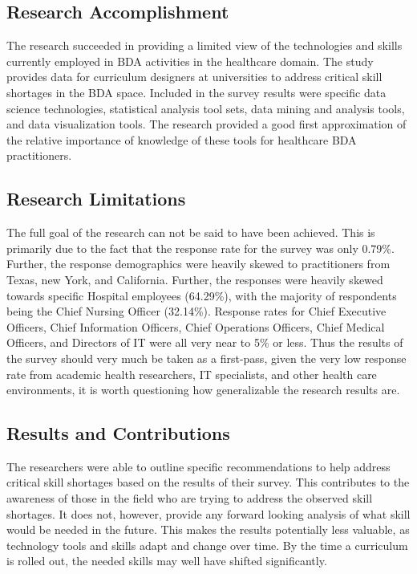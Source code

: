 \subsection{Research Accomplishment}

The research succeeded in providing a limited view of the technologies and skills currently employed in BDA activities in the healthcare domain. The study provides data for curriculum designers at universities to address critical skill shortages in the BDA space. Included in the survey results were specific data science technologies, statistical analysis tool sets, data mining and analysis tools, and data visualization tools. The research provided a good first approximation of the relative importance of knowledge of these tools for healthcare BDA practitioners.

\subsection{Research Limitations}

The full goal of the research can not be said to have been achieved. This is primarily due to the fact that the response rate for the survey was only 0.79\%. Further, the response demographics were heavily skewed to practitioners from Texas, new York, and California. Further, the responses were heavily skewed towards specific Hospital employees (64.29\%), with the majority of respondents being the Chief Nursing Officer (32.14\%). Response rates for Chief Executive Officers, Chief Information Officers, Chief Operations Officers, Chief Medical Officers, and Directors of IT were all very near to 5\% or less. Thus the results of the survey should very much be taken as a first-pass, given the very low response rate from academic health researchers, IT specialists, and other health care environments, it is worth questioning how generalizable the research results are.

\subsection{Results and Contributions}

The researchers were able to outline specific recommendations to help address critical skill shortages based on the results of their survey. This contributes to the awareness of those in the field who are trying to address the observed skill shortages. It does not, however, provide any forward looking analysis of what skill would be needed in the future. This makes the results potentially less valuable, as technology tools and skills adapt and change over time. By the time a curriculum is rolled out, the needed skills may well have shifted significantly.


